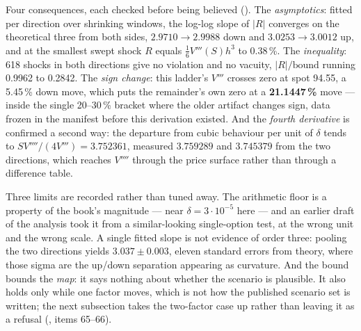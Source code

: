 \documentclass[11pt,a4paper]{article}
\begin{document}
Four consequences, each checked before being believed ().
The \emph{asymptotics}: fitted per direction over shrinking windows, the log-log slope of $\lvert R\rvert$
converges on the theoretical three from both sides, $2.9710 \to 2.9988$ down and
$3.0253 \to 3.0012$ up, and at the smallest swept shock $R$ equals $\tfrac16 V'''(S)h^3$ to
0.38\,\%. The \emph{inequality}: 618 shocks in both directions give no violation and no vacuity,
$\lvert R\rvert/\text{bound}$ running 0.9962 to 0.2842. The \emph{sign change}: this ladder's
$V'''$ crosses zero at spot 94.55, a 5.45\,\% down move, which puts the remainder's own zero at a
\textbf{21.1447\,\%} move --- inside the single 20--30\,\% bracket where the older artifact changes
sign, data frozen in the manifest before this derivation existed. And the \emph{fourth derivative}
is confirmed a second way: the departure from cubic behaviour per unit of $\delta$ tends to
$S V''''/(4V''') = 3.752361$, measured $3.759289$ and $3.745379$ from the two directions, which
reaches $V''''$ through the price surface rather than through a difference table.

Three limits are recorded rather than tuned away. The arithmetic floor is a property of the book's
magnitude --- near $\delta = 3\cdot10^{-5}$ here --- and an earlier draft of the analysis took it
from a similar-looking single-option test, at the wrong unit and the wrong scale. A single fitted
slope is not evidence of order three: pooling the two directions yields $3.037 \pm 0.003$, eleven
standard errors from theory, where those sigma are the up/down separation appearing as curvature.
And the bound bounds the \emph{map}: it says nothing about whether the scenario is plausible. It
also holds only while one factor moves, which is not how the published scenario set is written; the
next subsection takes the two-factor case up rather than leaving it as a refusal
(, items 65--66).
\end{document}
